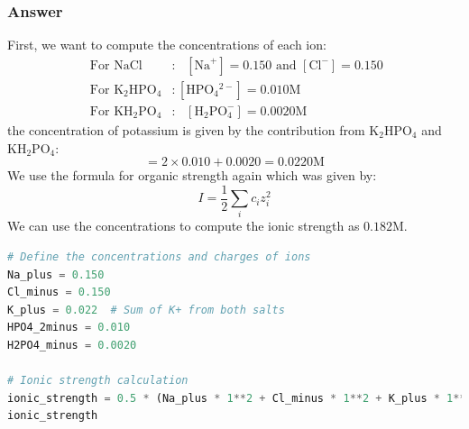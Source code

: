 \documentclass[12pt]{article}
\begin{document}
\subsubsection{Answer}
First, we want to compute the concentrations of each ion:
\begin{equation}
  \begin{aligned}
    \text { For } \mathrm{NaCl} & : \text { } [\mathrm{Na}^{+}]=0.150 \text { and } [\mathrm{Cl}^{-}]=0.150 \\
    \text { For } \mathrm{K}_{2} \mathrm{HPO}_{4} & : [\mathrm{HPO}_{4}{ }^{2-}]=0.010 \mathrm{M} \\
    \text { For } \mathrm{KH}_{2} \mathrm{PO}_{4} & : \text { } [\mathrm{H}_{2} \mathrm{PO}_{4}^{-}]=0.0020 \mathrm{M}
  \end{aligned}
\end{equation}
the concentration of potassium is given by the contribution from $\mathrm{K}_{2} \mathrm{HPO}_{4}$ and $\mathrm{KH}_{2} \mathrm{PO}_{4}$:
\begin{equation}
  [\mathrm{K}^{+}]=2 \times 0.010+0.0020=0.0220 \mathrm{M}
\end{equation}
We use the formula for organic strength again which was given by:
\begin{equation}
  I=\frac{1}{2} \sum_{i} c_{i} z_{i}^{2}
\end{equation}
We can use the concentrations to compute the ionic strength as $0.182 \mathrm{M}$.
\begin{lstlisting}[language=Python]
# Define the concentrations and charges of ions
Na_plus = 0.150
Cl_minus = 0.150
K_plus = 0.022  # Sum of K+ from both salts
HPO4_2minus = 0.010
H2PO4_minus = 0.0020

# Ionic strength calculation
ionic_strength = 0.5 * (Na_plus * 1**2 + Cl_minus * 1**2 + K_plus * 1**2 + HPO4_2minus * 2**2 + H2PO4_minus * 1**2)
ionic_strength
\end{lstlisting}
\end{document}
